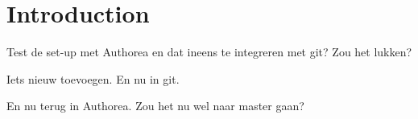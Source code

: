 \section{Introduction}
Test de set-up met Authorea en dat ineens te integreren met git? Zou het lukken?

Iets nieuw toevoegen. En nu in git.

En nu terug in Authorea. Zou het nu wel naar master gaan?